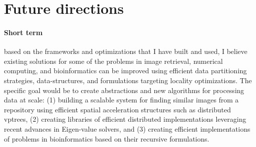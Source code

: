 


\section*{Future directions}
\paragraph{Short term} based on the frameworks and optimizations that I have built and used, I believe existing solutions for some of the problems in image retrieval, numerical computing, and bioinformatics can be improved using efficient data partitioning strategies, data-structures, and formulations targeting locality optimizations.  
The specific goal would be to create abstractions and new algorithms for processing data at scale:
(1) building a scalable system for finding similar images from a repository using efficient spatial acceleration structures such as distributed vptrees,
(2) creating libraries of efficient distributed implementations leveraging recent advances in Eigen-value solvers, and 
(3) creating efficient implementations of problems in bioinformatics based on their recursive formulations. 

